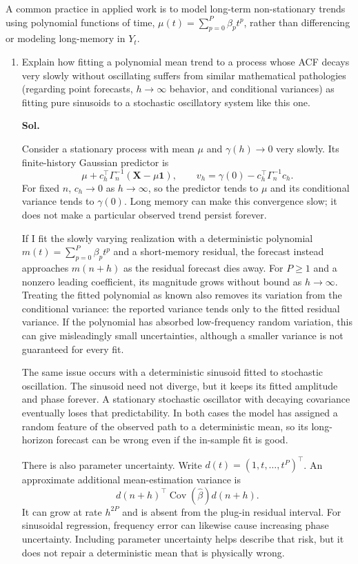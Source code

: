 \documentclass[lang=en,11pt,a4paper,citestyle =authoryear,nobib=true]{elegantpaper}
\begin{document}
\item A common practice in applied work is to model long-term non-stationary
trends using polynomial functions of time, $\mu(t)=\sum_{p=0}^{P}\beta_p t^p$,
rather than differencing or modeling long-memory in $Y_t$.
\begin{enumerate}[label=(\alph*),leftmargin=*]
\item Explain how fitting a polynomial mean trend to a process whose ACF
decays very slowly without oscillating suffers from similar mathematical
pathologies (regarding point forecasts, $h\to\infty$ behavior, and
conditional variances) as fitting pure sinusoids to a stochastic oscillatory
system like this one.

\par\vspace{0.5em}\noindent\textbf{Sol.}\par
Consider a stationary process with mean $\mu$ and $\gamma(h)\to0$
very slowly. Its finite-history Gaussian predictor is
\[
\mu+c_h^\top\Gamma_n^{-1}(\mathbf X-\mu\mathbf1),
\qquad v_h=\gamma(0)-c_h^\top\Gamma_n^{-1}c_h.
\]
For fixed $n$, $c_h\to0$ as $h\to\infty$, so the predictor tends to
$\mu$ and its conditional variance tends to $\gamma(0)$. Long memory can
make this convergence slow; it does not make a particular observed trend
persist forever.

If I fit the slowly varying realization with a deterministic polynomial
$m(t)=\sum_{p=0}^{P}\beta_pt^p$ and a short-memory residual, the forecast
instead approaches $m(n+h)$ as the residual forecast dies away. For
$P\ge1$ and a nonzero leading coefficient, its magnitude grows without
bound as $h\to\infty$. Treating the fitted polynomial as known also removes
its variation from the conditional variance: the reported variance tends
only to the fitted residual variance. If the polynomial has absorbed
low-frequency random variation, this can give misleadingly small
uncertainties, although a smaller variance is not guaranteed for every fit.

The same issue occurs with a deterministic sinusoid fitted to stochastic
oscillation. The sinusoid need not diverge, but it keeps its fitted amplitude
and phase forever. A stationary stochastic oscillator with decaying
covariance eventually loses that predictability. In both cases the model
has assigned a random feature of the observed path to a deterministic mean,
so its long-horizon forecast can be wrong even if the in-sample fit is good.

There is also parameter uncertainty. Write
$d(t)=(1,t,\ldots,t^P)^\top$. An approximate additional mean-estimation
variance is
\[
d(n+h)^\top\operatorname{Cov}(\widehat\beta)d(n+h).
\]
It can grow at rate $h^{2P}$ and is absent from the plug-in residual interval.
For sinusoidal regression, frequency error can likewise cause increasing
phase uncertainty. Including parameter uncertainty helps describe that
risk, but it does not repair a deterministic mean that is physically wrong.


\end{enumerate}
\end{document}
